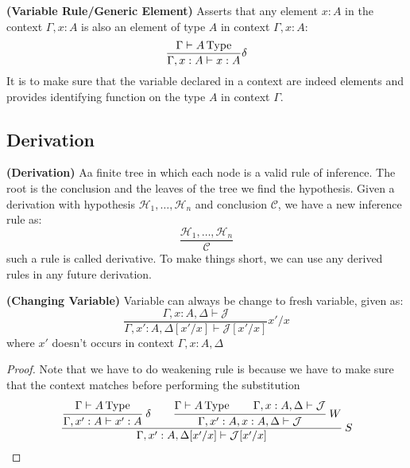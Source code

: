 \begin{definition}{\textbf{(Variable Rule/Generic Element)}}
    Asserts that any element $x:A$ in the context $\Gamma,x:A$ is also an element of type $A$ in context $\Gamma,x:A$:
    \begin{equation*}
        \frac{\Gamma\vdash A\operatorname{Type} }{\Gamma,x:A\vdash x:A}\delta
    \end{equation*}
    It is to make sure that the variable declared in a context are indeed elements and provides identifying function on the type $A$ in context $\Gamma$.
\end{definition}

\subsection{Derivation}

\begin{definition}{\textbf{(Derivation)}}
    Aa finite tree in which each node is a valid rule of inference. The root is the conclusion and the leaves of the tree we find the hypothesis. Given a derivation with hypothesis $\mathcal{H}_1,\dots,\mathcal{H}_n$ and conclusion $\mathcal{C}$, we have a new inference rule as:
    \begin{equation*}
        \frac{\mathcal{H}_1,\dots,\mathcal{H}_n}{\mathcal{C}}
    \end{equation*}
    such a rule is called derivative. To make things short, we can use any derived rules in any future derivation.
\end{definition}

\begin{lemma}{\textbf{(Changing Variable)}}
    Variable can always be change to fresh variable, given as:
    \begin{equation*}
        \frac{\Gamma,x:A,\Delta\vdash\mathcal{J}}{\Gamma,x':A,\Delta[x'/x]\vdash\mathcal{J}[x'/x]}x'/x
    \end{equation*}
    where $x'$ doesn't occurs in context $\Gamma,x:A,\Delta$
\end{lemma}

\begin{proof}
    Note that we have to do weakening rule is because we have to make sure that the context matches before performing the substitution
    \begin{equation*}
        \cfrac{\cfrac{\Gamma\vdash A\type }{\Gamma, x':A\vdash x':A}\ \delta \qquad \cfrac{\Gamma\vdash A\type \qquad \Gamma,x:A,\Delta\vdash\mathcal{J}}{\Gamma,x':A,x:A,\Delta\vdash\mathcal{J}}\ W}{\Gamma,x':A,\Delta[x'/x]\vdash\mathcal{J}[x'/x]}\ S
    \end{equation*}
\end{proof}



